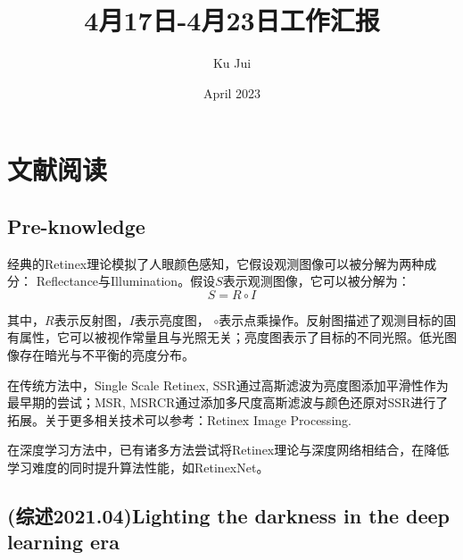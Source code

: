 \documentclass[letterpaper,12pt]{article}
\begin{document}
	
	
	\title{\songti {}4月17日-4月23日工作汇报}
	\author{\textrm{Ku Jui}}
	\date{\textrm{April 2023}}
	\maketitle
	
	\renewcommand{\figurename}{Figure} %
	\renewcommand{\contentsname}{Contents}
	
	\tableofcontents  %
	
	\section{文献阅读}

	\subsection{Pre-knowledge}
	
	经典的Retinex理论模拟了人眼颜色感知，它假设观测图像可以被分解为两种成分：
	Reflectance与Illumination。假设$S$表示观测图像，它可以被分解为：$$S = R \circ I$$

	其中，$R$表示反射图，$I$表示亮度图， $\circ$表示点乘操作。反射图描述了观测目标的固有属性，它可以被视作常量且与光照无关；亮度图表示了目标的不同光照。低光图像存在暗光与不平衡的亮度分布。
	
	在传统方法中，Single Scale Retinex, SSR通过高斯滤波为亮度图添加平滑性作为最早期的尝试；MSR, MSRCR通过添加多尺度高斯滤波与颜色还原对SSR进行了拓展。关于更多相关技术可以参考：Retinex Image Processing.

	在深度学习方法中，已有诸多方法尝试将Retinex理论与深度网络相结合，在降低学习难度的同时提升算法性能，如RetinexNet。
	
	\subsection{(综述2021.04)Lighting the darkness in the deep learning era}
	
\end{document}
